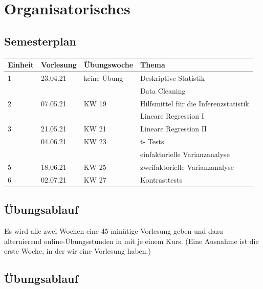 \documentclass[
]{book}
\begin{document}
\hypertarget{organisatorisches}{%
\section{Organisatorisches}\label{organisatorisches}}

\hypertarget{semesterplan-1}{%
\subsection{Semesterplan}\label{semesterplan-1}}

\begin{tabular}[t]{llll}
\toprule
Einheit & Vorlesung & Übungswoche & Thema\\
\midrule
1 & 23.04.21 & keine Übung & Deskriptive Statistik\\
 &  &  & Data Cleaning\\
2 & 07.05.21 & KW 19 & Hilfsmittel für die Inferenzstatistik\\
 &  &  & Lineare Regression I\\
3 & 21.05.21 & KW 21 & Lineare Regression II\\
\addlinespace
4 & 04.06.21 & KW 23 & t- Tests\\
 &  &  & einfaktorielle Varianzanalyse\\
5 & 18.06.21 & KW 25 & zweifaktorielle Varianzanalyse\\
6 & 02.07.21 & KW 27 & Kontrasttests\\
\bottomrule
\end{tabular}

\hypertarget{uxfcbungsablauf}{%
\subsection{Übungsablauf}\label{uxfcbungsablauf}}

Es wird alle zwei Wochen eine 45-minütige Vorlesung geben und dazu alternierend online-Übungsstunden in mit je einem Kurs. (Eine Ausnahme ist die erste Woche, in der wir eine Vorlesung haben.)

\hypertarget{uxfcbungsablauf-1}{%
\subsection{Übungsablauf}\label{uxfcbungsablauf-1}}
\end{document}
